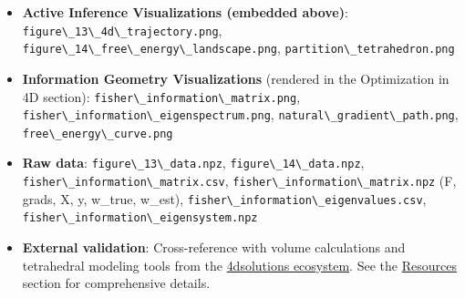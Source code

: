 \documentclass[
  10pt,
]{article}
\newcommand{\passthrough}[1]{#1}
\providecommand{\tightlist}{%
  \setlength{\itemsep}{0pt}\setlength{\parskip}{0pt}}
\begin{document}
\begin{itemize}
\tightlist
\item
  \textbf{Active Inference Visualizations (embedded above)}:
  \passthrough{\lstinline!figure\_13\_4d\_trajectory.png!},
  \passthrough{\lstinline!figure\_14\_free\_energy\_landscape.png!},
  \passthrough{\lstinline!partition\_tetrahedron.png!}
\item
  \textbf{Information Geometry Visualizations} (rendered in the
  Optimization in 4D section):
  \passthrough{\lstinline!fisher\_information\_matrix.png!},
  \passthrough{\lstinline!fisher\_information\_eigenspectrum.png!},
  \passthrough{\lstinline!natural\_gradient\_path.png!},
  \passthrough{\lstinline!free\_energy\_curve.png!}
\item
  \textbf{Raw data}: \passthrough{\lstinline!figure\_13\_data.npz!},
  \passthrough{\lstinline!figure\_14\_data.npz!},
  \passthrough{\lstinline!fisher\_information\_matrix.csv!},
  \passthrough{\lstinline!fisher\_information\_matrix.npz!} (F, grads,
  X, y, w\_true, w\_est),
  \passthrough{\lstinline!fisher\_information\_eigenvalues.csv!},
  \passthrough{\lstinline!fisher\_information\_eigensystem.npz!}
\item
  \textbf{External validation}: Cross-reference with volume calculations
  and tetrahedral modeling tools from the
  \href{https://github.com/4dsolutions}{4dsolutions ecosystem}. See the
  \href{07_resources.md}{Resources} section for comprehensive details.
\end{itemize}
\end{document}
